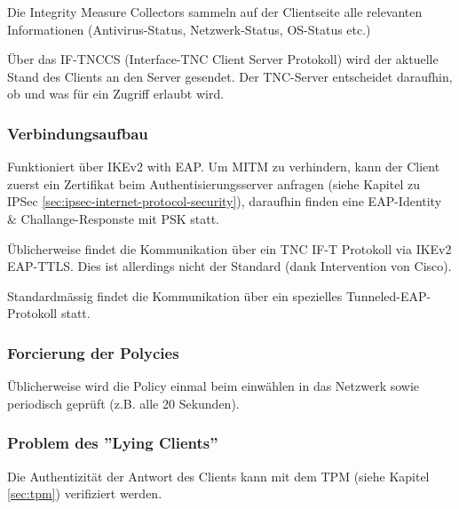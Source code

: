 Die Integrity Measure Collectors sammeln auf der Clientseite alle relevanten Informationen (Antivirus-Status, Netzwerk-Status, OS-Status etc.)

Über das IF-TNCCS (Interface-TNC Client Server Protokoll) wird der aktuelle Stand des Clients an den Server gesendet. Der TNC-Server entscheidet daraufhin, ob und was für ein Zugriff erlaubt wird.

\subsubsection{Verbindungsaufbau}

Funktioniert über IKEv2 with EAP. Um MITM zu verhindern, kann der Client zuerst ein Zertifikat beim Authentisierungsserver anfragen (siehe Kapitel zu IPSec \ref{sec:ipsec-internet-protocol-security}), daraufhin finden eine EAP-Identity \& Challange-Responste mit PSK statt.

Üblicherweise findet die Kommunikation über ein TNC IF-T Protokoll via IKEv2 EAP-TTLS. Dies ist allerdings nicht der Standard (dank Intervention von Cisco).

Standardmässig findet die Kommunikation über ein spezielles Tunneled-EAP-Protokoll statt.

\subsubsection{Forcierung der Polycies}

Üblicherweise wird die Policy einmal beim einwählen in das Netzwerk sowie periodisch geprüft (z.B. alle 20 Sekunden). 

\subsubsection{Problem des ''Lying Clients''}
Die Authentizität der Antwort des Clients kann mit dem TPM (siehe Kapitel \ref{sec:tpm}) verifiziert werden.

